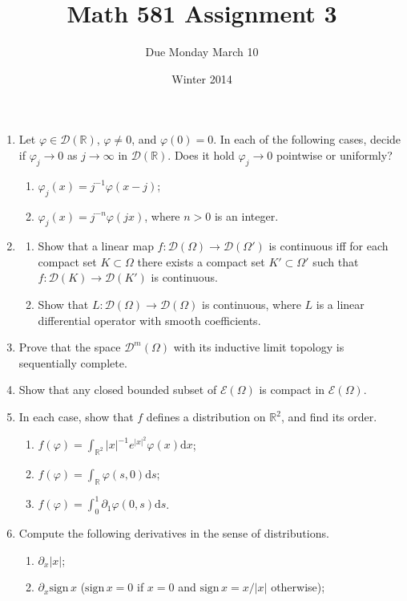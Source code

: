 \documentclass[11pt]{amsart}
\title{Math 581 Assignment 3}
\author{Due Monday March 10}
\date{Winter 2014}                                           %
\newcommand{\R}{\mathbb{R}}
\newcommand{\tstD}{\mathscr{D}}
\newcommand{\tstE}{\mathscr{E}}
\newcommand{\exd}{\mathrm{d}}
\begin{document}
\maketitle

\begin{enumerate}[1.]
\item
Let $\varphi\in\tstD(\R)$, $\varphi\neq0$, and $\varphi(0)=0$.
In each of the following cases, decide if $\varphi_j\to0$ as $j\to\infty$ in $\tstD(\R)$.
Does it hold $\varphi_j\to0$ pointwise or uniformly?
\begin{enumerate}[{\em a)}]
\item
$\varphi_j(x)=j^{-1}\varphi(x-j)$;
\item
$\varphi_j(x)=j^{-n}\varphi(jx)$, where $n>0$ is an integer.
\end{enumerate}
\item
\begin{enumerate}[{\em a)}]
\item
Show that a linear map $f:\tstD(\Omega)\to\tstD(\Omega')$ is continuous iff for each compact set $K\subset\Omega$ there exists a compact set $K'\subset\Omega'$ such that $f:\tstD(K)\to\tstD(K')$ is continuous.
\item
Show that $L:\tstD(\Omega)\to\tstD(\Omega)$ is continuous, where $L$ is a linear differential operator with smooth coefficients.
\end{enumerate}
\item
Prove that the space $\tstD^m(\Omega)$ with its inductive limit topology is sequentially complete.
\item
Show that any closed bounded subset of $\tstE(\Omega)$ is compact in $\tstE(\Omega)$.
\item
In each case, show that $f$ defines a distribution on $\R^2$, and find its order.
\begin{enumerate}[{\em a)}]
\item
$f(\varphi)=\int_{\R^2}|x|^{-1}e^{|x|^2}\varphi(x)\exd x$;
\item
$f(\varphi)=\int_{\R}\varphi(s,0)\exd s$;
\item
$f(\varphi)=\int_{0}^{1}\partial_1\varphi(0,s)\exd s$.
\end{enumerate}
\item
Compute the following derivatives in the sense of distributions.
\begin{enumerate}[{\em a)}]
\item
$\partial_x|x|$;
\item
$\partial_x\mathrm{sign}\,x$ ($\mathrm{sign}\,x=0$ if $x=0$ and $\mathrm{sign}\,x=x/|x|$ otherwise);

\end{enumerate}
\end{enumerate}
\end{document}
